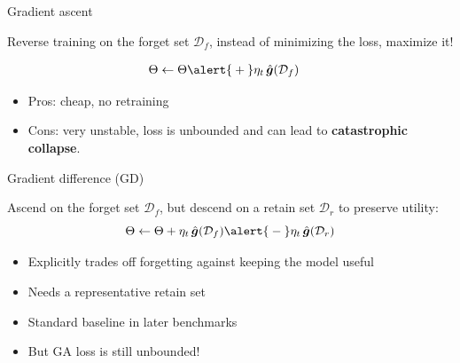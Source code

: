 \documentclass[12pt,aspectratio=169,handout]{beamer}
\begin{document}
\begin{frame}{Gradient ascent}

\alert{Reverse} training on the forget set $\mathcal{D}_f$, instead of minimizing the loss, maximize it!

\begin{align*}
\Theta &\gets \Theta \alert{{}+{}} \eta_t\, \hat{\bm{g}}(\mathcal{D}_f)
\end{align*}

\begin{itemize}
    \item Pros: cheap, no retraining
    \item Cons: very unstable, loss is unbounded and can lead to \textbf{catastrophic collapse}.
\end{itemize}

    
\end{frame}



\begin{frame}{Gradient difference (GD)}

Ascend on the forget set $\mathcal{D}_f$, but \alert{descend} on a retain set $\mathcal{D}_r$ to preserve utility:
\[
\Theta \gets \Theta + \eta_t\, \hat{\bm{g}}(\mathcal{D}_f) \alert{{}-{}} \eta_t\, \hat{\bm{g}}(\mathcal{D}_r)
\]

    \begin{itemize}
    \item Explicitly trades off forgetting against keeping the model useful
    \item Needs a representative retain set
    \item Standard baseline in later benchmarks
    \item But GA loss is still unbounded!
\end{itemize}


\end{frame}
\end{document}
